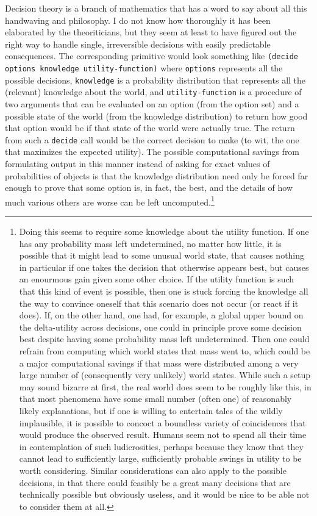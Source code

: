 \documentclass[12pt]{article}
\newcommand{\code}[1]{\texttt{#1}}
\begin{document}
Decision theory is a branch of mathematics that has a word to say
about all this handwaving and philosophy.  I do not know how
thoroughly it has been elaborated by the theoriticians, but they seem
at least to have figured out the right way to handle single,
irreversible decisions with easily predictable consequences.  The
corresponding primitive would look something like \code{(decide
options knowledge utility-function)} where \code{options} represents all
the possible decisions, \code{knowledge} is a probability distribution
that represents all the (relevant) knowledge about the world, and
\code{utility-function} is a procedure of two arguments that can be
evaluated on an option (from the option set) and a possible state of
the world (from the knowledge distribution) to return how good that
option would be if that state of the world were actually true.  The
return from such a \code{decide} call would be the correct decision to
make (to wit, the one that maximizes the expected utility).  The possible
computational savings from formulating output in this manner instead
of asking for exact values of probabilities of objects is that the
knowledge distribution need only be forced far enough to prove that
some option is, in fact, the best, and the details of how much various
others are worse can be left uncomputed.\footnote{Doing this seems to
require some knowledge about the utility function.  If one has any
probability mass left undetermined, no matter how little, it is
possible that it might lead to some unusual world state, that causes
nothing in particular if one takes the decision that otherwise appears
best, but causes an enourmous gain given some other
choice.  If the utility function is such that this kind of event is
possible, then one is stuck forcing the knowledge all the way to
convince oneself that this scenario does not occur (or react if it
does).  If, on the other hand, one had, for example, a global upper
bound on the delta-utility across decisions, one could in principle prove
some decision best despite having some probability mass left
undetermined.  Then one could refrain from computing which world
states that mass went to, which could be a major computational savings
if that mass were distributed among a very large number of
(consequently very unlikely) world states.  While such a setup may
sound bizarre at first, the real world does seem to be roughly like
this, in that most phenomena have some small number (often one) of
reasonably likely explanations, but if one is willing to entertain
tales of the wildly implausible, it is possible to concoct a boundless
variety of coincidences that would produce the observed result.
Humans seem not to spend all their time in contemplation of such
ludicrosities, perhaps because they know that they cannot lead to
sufficiently large, sufficiently probable swings in utility to be
worth considering.  Similar considerations can also apply to the 
possible decisions, in that there could feasibly be a great many 
decisions that are technically possible but obviously useless, and
it would be nice to be able not to consider them at all.}
\end{document}
